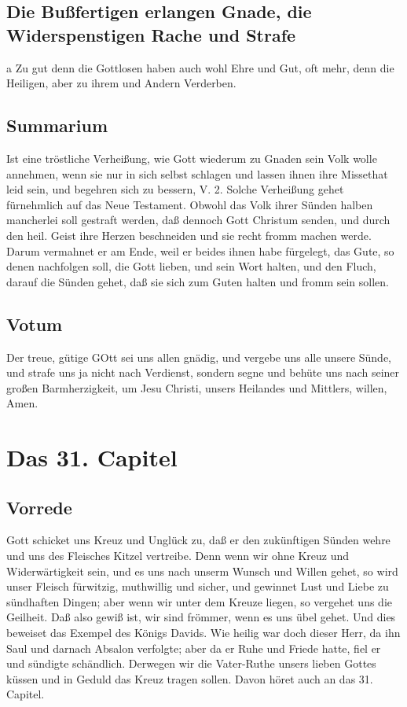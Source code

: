 \section[Die Bußfertigen erlangen Gnade, die Widerspenstigen Rache und]{Die Bußfertigen erlangen Gnade, die Widerspenstigen Rache und Strafe}

a Zu gut denn die Gottlosen haben auch wohl Ehre und Gut, oft mehr, denn die Heiligen, aber zu ihrem und Andern Verderben.

\section{Summarium}

Ist eine tröstliche Verheißung, wie Gott wiederum zu Gnaden sein Volk wolle annehmen, wenn sie nur in sich selbst schlagen und lassen ihnen ihre Missethat leid sein, und begehren sich zu bessern, V. 2. Solche Verheißung gehet fürnehmlich auf das Neue Testament. Obwohl das Volk ihrer Sünden halben mancherlei soll gestraft werden, daß dennoch Gott Christum senden, und durch den heil. Geist ihre Herzen beschneiden und sie recht fromm machen werde. Darum vermahnet er am Ende, weil er beides ihnen habe fürgelegt, das Gute, so denen nachfolgen soll, die Gott lieben, und sein Wort halten, und den Fluch, darauf die Sünden gehet, daß sie sich zum Guten halten und fromm sein sollen.

\section{Votum}

Der treue, gütige GOtt sei uns allen gnädig, und vergebe uns alle unsere Sünde, und strafe uns ja nicht nach Verdienst, sondern segne und behüte uns nach seiner großen Barmherzigkeit, um Jesu Christi, unsers Heilandes und Mittlers, willen, Amen.

\chapter{Das 31. Capitel}

\section{Vorrede}

Gott schicket uns Kreuz und Unglück zu, daß er den zukünftigen Sünden wehre und uns des Fleisches Kitzel vertreibe. Denn wenn wir ohne Kreuz und Widerwärtigkeit sein, und es uns nach unserm Wunsch und Willen gehet, so wird unser Fleisch fürwitzig, muthwillig und sicher, und gewinnet Lust und Liebe zu sündhaften Dingen; aber wenn wir unter dem Kreuze liegen, so vergehet uns die Geilheit. Daß also gewiß ist, wir sind frömmer, wenn es uns übel gehet. Und dies beweiset das Exempel des Königs Davids. Wie heilig war doch dieser Herr, da ihn Saul und darnach Absalon verfolgte; aber da er Ruhe und Friede hatte, fiel er und sündigte schändlich. Derwegen wir die Vater-Ruthe unsers lieben Gottes küssen und in Geduld das Kreuz tragen sollen. Davon höret auch an das 31. Capitel.


